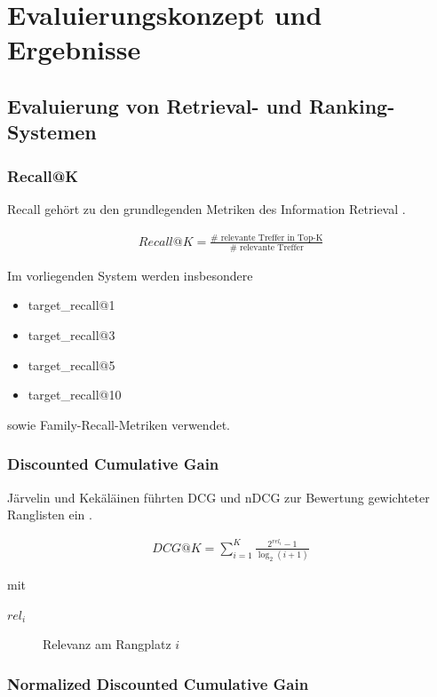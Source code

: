 \chapter{Evaluierungskonzept und Ergebnisse}


\section{Evaluierung von Retrieval- und Ranking-Systemen}

\subsection{Recall@K}

Recall gehört zu den grundlegenden Metriken des Information Retrieval \cite{manning2008ir}.

\begin{align}
  Recall@K = \frac{ \# \text{ relevante Treffer in Top-K} } { \# \text{ relevante Treffer} }
\end{align}

Im vorliegenden System werden insbesondere

\begin{itemize}
  \item target\_recall@1
  \item target\_recall@3
  \item target\_recall@5
  \item target\_recall@10
\end{itemize}

sowie Family-Recall-Metriken verwendet.

\subsection{Discounted Cumulative Gain}

Järvelin und Kekäläinen führten DCG und nDCG zur Bewertung gewichteter Ranglisten ein \cite{jarvelin2002dcg}.

\begin{align}
  DCG@K = \sum_{i=1}^{K} \frac{2^{rel_i}-1} {\log_2(i+1)}
\end{align}

mit

\begin{description}
  \item[$rel_i$] Relevanz am Rangplatz $i$
\end{description}

\subsection{Normalized Discounted Cumulative Gain}

